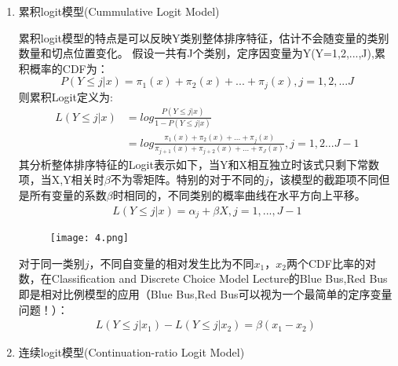 \documentclass[cn]{elegantpaper}
\begin{document}
\begin{enumerate}
\item{累积logit模型(Cummulative Logit Model)}

累积logit模型的特点是可以反映Y类别整体排序特征，估计不会随变量的类别数量和切点位置变化。
假设一共有J个类别，定序因变量为Y(Y=1,2,...,J),累积概率的CDF为：
{\setlength\abovedisplayskip{5pt}
\setlength\belowdisplayskip{5pt}
\begin{equation}
P( Y\leq j | x) = \pi_{1}(x) + \pi_{2}(x) + ... +\pi_{j}(x),   j = 1, 2, ... J
\end{equation}}
则累积Logit定义为:
{\setlength\abovedisplayskip{5pt}
\setlength\belowdisplayskip{10pt}
\begin{equation}
\begin{split}
L( Y \leq j | x) &= log \frac{P( Y \leq j | x)}{1-P( Y \leq j | x)}\\ 
&= log  \frac{\pi_{1}(x) + \pi_{2}(x) + ... +\pi_{j}(x)}{\pi_{j+1}(x) + \pi_{j+2}(x) + ... +\pi_{J}(x)}, j = 1,2 ...J-1
\end{split}
\end{equation}}
其分析整体排序特征的Logit表示如下，当Y和X相互独立时该式只剩下常数项，当X,Y相关时$\beta$不为零矩阵。特别的对于不同的$j$，该模型的截距项不同但是所有变量的系数$\beta$时相同的，不同类别的概率曲线在水平方向上平移。
{\setlength\abovedisplayskip{5pt}
\setlength\belowdisplayskip{5pt}
\begin{equation}
\begin{split}
L( Y \leq j | x) = \alpha_{j} + \beta X, j=1,...,J-1
\end{split}
\end{equation}}
\begin{figure}[H]
	\centering
	\texttt{[image: 4.png]}
\end{figure}
对于同一类别$j$，不同自变量的相对发生比为不同$x_{1}$，$x_{2}$两个CDF比率的对数，在Classification and Discrete Choice Model Lecture的Blue Bus,Red Bus即是相对比例模型的应用（Blue Bus,Red Bus可以视为一个最简单的定序变量问题！）：
{\setlength\abovedisplayskip{5pt}
\setlength\belowdisplayskip{5pt}
\begin{equation}
\begin{split}
L(Y\leq j | x_{1})-L(Y\leq j | x_{2}) = \beta (x_{1}-x_{2})
\
\end{split}
\end{equation}}
\item{连续logit模型(Continuation-ratio Logit Model)}


\end{enumerate}
\end{document}
